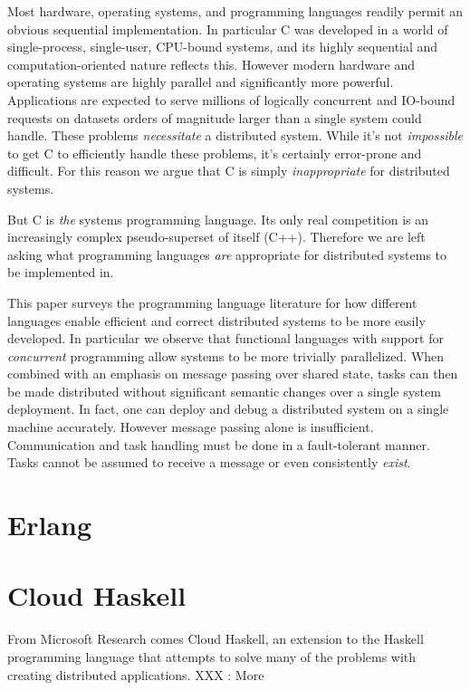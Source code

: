 \documentclass[10pt,a4paper,twocolumn]{article}
\begin{document}
Most hardware, operating systems, and programming languages readily permit an
obvious sequential implementation. In particular C was developed in a world of
single-process, single-user, CPU-bound systems, and its highly sequential and
computation-oriented nature reflects this. However modern hardware
and operating systems are highly parallel and significantly more powerful.
Applications are expected to serve millions of logically concurrent and IO-bound
requests on datasets orders of magnitude larger than a single system could
handle. These problems \emph{necessitate} a distributed system. While it's not
\emph{impossible} to get C to efficiently handle these problems, it's certainly
error-prone and difficult. For this reason we argue that C is simply
\emph{inappropriate} for distributed systems.

But C is \emph{the} systems programming language. Its only real competition is
an increasingly complex pseudo-superset of itself (C++). Therefore we are left
asking what programming languages \emph{are} appropriate for distributed systems
to be implemented in.

This paper surveys the programming language literature for how different
languages enable efficient and correct distributed systems to be more easily
developed. In particular we observe that functional languages with support for
\emph{concurrent} programming allow systems to be more trivially parallelized.
When combined with an emphasis on message passing over shared state, tasks can
then be made distributed without significant semantic changes over a single
system deployment. In fact, one can deploy and debug a distributed system on a
single machine accurately. However message passing alone is insufficient.
Communication and task handling must be done in a fault-tolerant manner. Tasks
cannot be assumed to receive a message or even consistently \emph{exist}.

\section{Erlang}

\section{Cloud Haskell}

From Microsoft Research comes Cloud Haskell, an extension to the Haskell
programming language that attempts to solve many of the problems with creating
distributed applications. XXX : More
\end{document}

